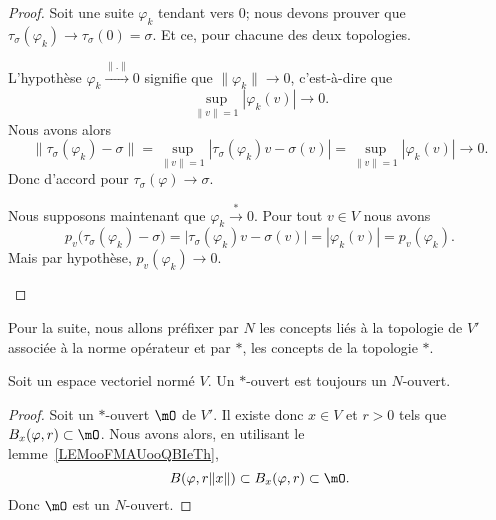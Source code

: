 \begin{proof}
	Soit une suite \( \varphi_k\) tendant vers \( 0\); nous devons prouver que \( \tau_{\sigma}(\varphi_k)\to \tau_{\sigma}(0)=\sigma\). Et ce, pour chacune des deux topologies.

	\begin{subproof}

		L'hypothèse \( \varphi_k\stackrel{\| . \|}{\longrightarrow} 0\) signifie que \( \| \varphi_k \|\to 0\), c'est-à-dire que
		\begin{equation}
			\sup_{\| v \|=1}| \varphi_k(v) |\to 0.
		\end{equation}
		Nous avons alors
		\begin{equation}
			\| \tau_{\sigma}(\varphi_k)-\sigma \|=\sup_{\| v \|=1}| \tau_{\sigma}(\varphi_k)v-\sigma(v) |=\sup_{\| v \|=1}| \varphi_k(v) |\to 0.
		\end{equation}
		Donc d'accord pour \( \tau_{\sigma}(\varphi)\to \sigma\).

		\spitem[Topologie \( *\)]

		Nous supposons maintenant que \( \varphi_k\stackrel{*}{\longrightarrow}0\). Pour tout \( v\in V\) nous avons
		\begin{equation}
			p_v\big( \tau_{\sigma}(\varphi_k)-\sigma \big)=\big| \tau_{\sigma}(\varphi_k)v-\sigma(v) \big|=| \varphi_k(v) |=p_v(\varphi_k).
		\end{equation}
		Mais par hypothèse, \( p_v(\varphi_k)\to 0\).
	\end{subproof}
\end{proof}

Pour la suite, nous allons préfixer par \( N\) les concepts liés à la topologie de \( V'\) associée à la norme opérateur et par \( *\), les concepts de la topologie \( *\).

\begin{proposition}     \label{PROPooFGXAooFRWweD}
	Soit un espace vectoriel normé \( V\). Un \( *\)-ouvert est toujours un \( N\)-ouvert.
\end{proposition}

\begin{proof}
	Soit un \( *\)-ouvert \( \mO\) de \( V'\). Il existe donc \( x\in V\) et \( r>0\) tels que \( B_x(\varphi,r)\subset \mO\). Nous avons alors, en utilisant le lemme~\ref{LEMooFMAUooQBIeTh},
	\begin{equation}
		B(\varphi,r\| x \|)\subset B_x(\varphi,r)\subset \mO.
	\end{equation}
	Donc \( \mO\) est un \( N\)-ouvert.
\end{proof}

